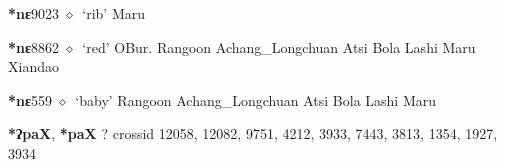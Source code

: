   \begin{list}{}{\leftmargin=1.5em \itemindent=-1.5em}
  \item {\footnotesize \textbf{*nɛ}}{\tiny 9023}
         $\diamond$~`rib'
         Maru 
  \item {\footnotesize \textbf{*nɛ}}{\tiny 8862}
\hspace{1ex}
         $\diamond$~`red'
         OBur. 
\hspace{1ex}
         Rangoon 
\hspace{1ex}
         Achang\_Longchuan 
\hspace{1ex}
         Atsi 
\hspace{1ex}
         Bola 
\hspace{1ex}
         Lashi 
\hspace{1ex}
         Maru 
\hspace{1ex}
         Xiandao 
  \item {\footnotesize \textbf{*nɛ}}{\tiny 559}
\hspace{1ex}
         $\diamond$~`baby'
         Rangoon 
\hspace{1ex}
         Achang\_Longchuan 
\hspace{1ex}
         Atsi 
\hspace{1ex}
         Bola 
\hspace{1ex}
         Lashi 
\hspace{1ex}
         Maru 
  \end{list}
\item
\textbf{*ʔpaX}, \textbf{*paX}
?
  {\tiny crossid 12058, 12082, 9751, 4212, 3933, 7443, 3813, 1354, 1927, 3934}
